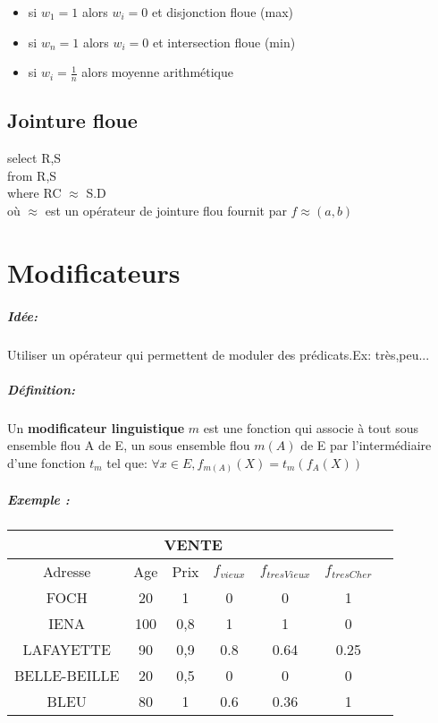 \documentclass[10pt,a4paper]{report}
\begin{document}
\begin{itemize}
\item si $w_1=1$ alors $w_i=0$ et disjonction floue (max)
\item si $w_n=1$ alors $w_i=0$ et intersection floue (min)
\item si $w_i=\frac{1}{n}$ alors moyenne arithmétique
\end{itemize}

\section{Jointure floue}
select R,S\\
from R,S\\
where RC $\approx$ S.D\\
où $\approx$ est un opérateur de jointure flou fournit par $f \approx (a,b)$ 



\chapter{Modificateurs}
\paragraph{Idée: \\}
Utiliser un opérateur qui permettent de moduler des prédicats.Ex: très,peu...
\paragraph{Définition: \\}
Un \textbf{modificateur linguistique} $m$ est une fonction qui associe à tout sous ensemble flou A de E, un sous ensemble flou $m(A)$ de E par l'intermédiaire d'une fonction $t_m$ tel que:
$\forall x \in E,f_{m(A)}(X)=t_m(f_A(X)) $
\paragraph{Exemple :\\}

\begin{tabular}{|c|c|c|c|c|c|c|}
\hline
\multicolumn{6}{|c|}{VENTE} \\

\hline 
Adresse & Age & Prix & $f_{vieux}$ & $f_{tresVieux}$ & $f_{tresCher}$ \\ 
\hline 
FOCH & 20 & 1 & 0 & 0 & 1\\ 
\hline 
IENA & 100 & 0,8 & 1 & 1 & 0\\ 
\hline 
LAFAYETTE & 90 & 0,9 & 0.8 & 0.64 & 0.25\\ 
\hline 
BELLE-BEILLE & 20 & 0,5 & 0 & 0 & 0\\ 
\hline 
BLEU & 80 & 1 & 0.6 & 0.36 & 1\\ 
\hline 
\end{tabular} 
\end{document}
